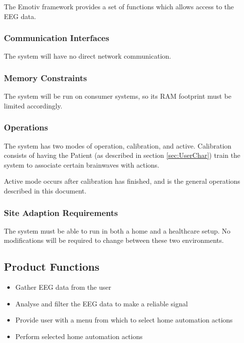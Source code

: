 \documentclass{article}
\begin{document}
The Emotiv framework provides a set of functions which allows access to the EEG data.

\subsubsection{Communication Interfaces}

The system will have no direct network communication.

\subsubsection{Memory Constraints}

The system will be run on consumer systems, so its RAM footprint must be
limited accordingly.

\subsubsection{Operations}

The system has two modes of operation, calibration, and active. Calibration
consists of having the Patient (as described in section \ref{sec:UserChar})
train the system to associate certain brainwaves with actions.

Active mode occurs after calibration has finished, and is the general
operations described in this document.

\subsubsection{Site Adaption Requirements}

The system must be able to run in both a home and a healthcare setup. No
modifications will be required to change between these two environments.

\subsection{Product Functions}

\begin{itemize}
\item Gather EEG data from the user
\item Analyse and filter the EEG data to make a reliable signal
\item Provide user with a menu from which to select home automation actions
\item Perform selected home automation actions
\end{itemize}
\end{document}
